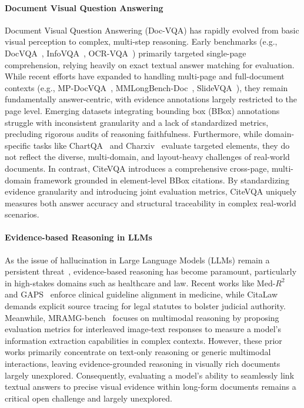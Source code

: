 \documentclass{llmxive}
\begin{document}
\paragraph{Document Visual Question Answering}
Document Visual Question Answering (Doc-VQA) has rapidly evolved from basic visual perception to complex, multi-step reasoning. Early benchmarks (e.g., DocVQA~\citep{mathew2021docvqa}, InfoVQA~\citep{mathew2022infographicvqa}, OCR-VQA~\citep{mishra2019ocr}) primarily targeted single-page comprehension, relying heavily on exact textual answer matching for evaluation. While recent efforts have expanded to handling multi-page and full-document contexts (e.g., MP-DocVQA~\citep{tito2023hierarchical}, MMLongBench-Doc~\citep{ma2024mmlongbench}, SlideVQA~\citep{tanaka2023slidevqa}), they remain fundamentally answer-centric, with evidence annotations largely restricted to the page level. Emerging datasets integrating bounding box (BBox) annotations~\citep{loison2026vidore, yu2026sciegqadatasetscientificevidencegrounded} struggle with inconsistent granularity and a lack of standardized metrics, precluding rigorous audits of reasoning faithfulness. Furthermore, while domain-specific tasks like ChartQA~\citep{masry2022chartqa} and Charxiv~\citep{wang2024charxiv} evaluate targeted elements, they do not reflect the diverse, multi-domain, and layout-heavy challenges of real-world documents. In contrast, CiteVQA introduces a comprehensive cross-page, multi-domain framework grounded in element-level BBox citations. By standardizing evidence granularity and introducing joint evaluation metrics, CiteVQA uniquely measures both answer accuracy and structural traceability in complex real-world scenarios.

\paragraph{Evidence-based Reasoning in LLMs}
As the issue of hallucination in Large Language Models (LLMs) remain a persistent threat~\citep{wang2025rare, zhao2026retrieval, nakano2021webgpt, gao2023enabling, min2023factscore}, evidence-based reasoning has become paramount, particularly in high-stakes domains such as healthcare and law. Recent works like Med-$R^2$~\citep{lu2025med} and GAPS~\citep{chen2025gaps} enforce clinical guideline alignment in medicine, while CitaLaw~\citep{zhang2025citalaw} demands explicit source tracing for legal statutes to bolster judicial authority. Meanwhile, MRAMG-bench~\citep{yu2025mramg} focuses on multimodal reasoning by proposing evaluation metrics for interleaved image-text responses to measure a model's information extraction capabilities in complex contexts. However, these prior works primarily concentrate on text-only reasoning or generic multimodal interactions, leaving evidence-grounded reasoning in visually rich documents largely unexplored. Consequently, evaluating a model's ability to seamlessly link textual answers to precise visual evidence within long-form documents remains a critical open challenge and largely unexplored.
\end{document}
